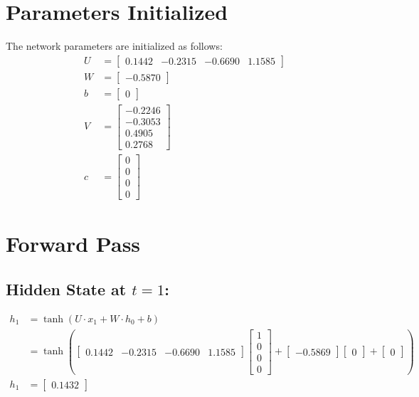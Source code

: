 \documentclass{article}
\begin{document}
\section{Parameters Initialized}
The network parameters are initialized as follows:
\begin{align*}
U &= \begin{bmatrix}
    0.1442 & -0.2315 & -0.6690 & 1.1585
\end{bmatrix} \\
W &= \begin{bmatrix}
    -0.5870
\end{bmatrix}\\
b &= \begin{bmatrix}
    0
\end{bmatrix}\\
V &= \begin{bmatrix}
    -0.2246 \\
    -0.3053 \\
    0.4905 \\
    0.2768
\end{bmatrix}\\
c &= \begin{bmatrix}
    0 \\
    0 \\
    0 \\
    0
\end{bmatrix}
\end{align*}
\newpage
\section{Forward Pass}
\subsection{Hidden State at \(t=1\):}

\begin{align*}
h_1 &= \tanh(U \cdot x_1 + W \cdot h_0 + b) \\
&= \tanh\left(\begin{bmatrix}
0.1442 & -0.2315 & -0.6690 & 1.1585
\end{bmatrix} \begin{bmatrix}
1 \\
0 \\
0 \\
0
\end{bmatrix} + \begin{bmatrix}
-0.5869
\end{bmatrix} \begin{bmatrix}
0
\end{bmatrix} + \begin{bmatrix}
0
\end{bmatrix}\right) \\
h_1 &= \begin{bmatrix}
0.1432
\end{bmatrix}
\end{align*}
\end{document}
